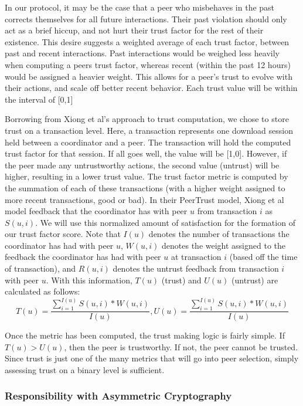 \documentclass[12pt]{article}
\begin{document}
			In our protocol, it may be the case that a peer who misbehaves in the past corrects themselves for all future interactions. Their past violation should only act as a brief hiccup, and not hurt their trust factor for the rest of their existence. This desire suggests a weighted average of each trust factor, between past and recent interactions. Past interactions would be weighed less heavily when computing a peers trust factor, whereas recent (within the past 12 hours) would be assigned a heavier weight. This allows for a peer's trust to evolve with their actions, and scale off better recent behavior. Each trust value will be within the interval of [0,1]

			Borrowing from Xiong et al's approach to trust computation, we chose to store trust on a transaction level. Here, a transaction represents one download session held between a coordinator and a peer. The transaction will hold the computed trust factor for that session. If all goes well, the value will be [1,0]. However, if the peer made any untrustworthy actions, the second value (untrust) will be higher, resulting in a lower trust value. The trust factor metric is computed by the summation of each of these transactions (with a higher weight assigned to more recent transactions, good or bad). In their PeerTrust model, Xiong et al model feedback that the coordinator has with peer $u$ from transaction $i$ as $S(u,i)$. We will use this normalized amount of satisfaction for the formation of our trust factor score. Note that $I(u)$ denotes the number of transactions the coordinator has had with peer $u$, $W(u,i)$ denotes the weight assigned to the feedback the coordinator has had with peer $u$ at transaction $i$ (based off the time of transaction), and $R(u,i)$ denotes the untrust feedback from transaction $i$ with peer $u$. With this information, $T(u)$ (trust) and $U(u)$ (untrust) are calculated as follows:
			$$
				T(u) = \frac{\sum\limits_{i=1}^{I(u)} S(u,i) * W(u,i)}{I(u)},
				U(u) = \frac{\sum\limits_{i=1}^{I(u)} S(u,i) * W(u,i)}{I(u)}
			$$

			Once the metric has been computed, the trust making logic is fairly simple. If $T(u) > U(u)$, then the peer is trustworthy. If not, the peer cannot be trusted. Since trust is just one of the many metrics that will go into peer selection, simply assessing trust on a binary level is sufficient. 

		\subsubsection{Responsibility with Asymmetric Cryptography}
\end{document}

